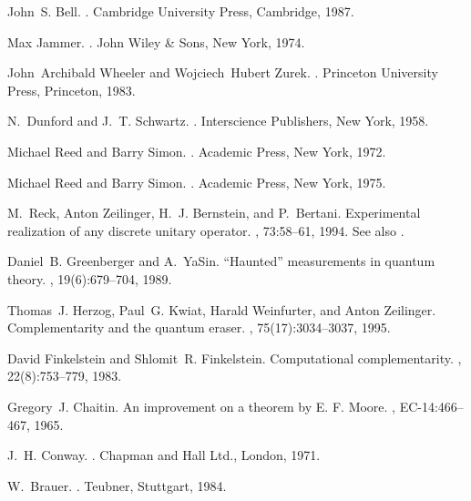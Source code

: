 \documentclass [11pt]{llncs}
\begin{document}
\begin{thebibliography}{10}
John~S. Bell.
.
\newblock Cambridge University Press, Cambridge, 1987.

Max Jammer.
.
\newblock John Wiley \& Sons, New York, 1974.

John~Archibald Wheeler and Wojciech~Hubert Zurek.
.
\newblock Princeton University Press, Princeton, 1983.

N.~Dunford and J.~T. Schwartz.
.
\newblock Interscience Publishers, New York, 1958.

Michael Reed and Barry Simon.
.
\newblock Academic Press, New York, 1972.

Michael Reed and Barry Simon.
.
\newblock Academic Press, New York, 1975.

M.~Reck, Anton Zeilinger, H.~J. Bernstein, and P.~Bertani.
\newblock Experimental realization of any discrete unitary operator.
, 73:58--61, 1994.
\newblock See also \cite{murnaghan}.

Daniel~B. Greenberger and A.~YaSin.
\newblock ``{H}aunted'' measurements in quantum theory.
, 19(6):679--704, 1989.

Thomas~J. Herzog, Paul~G. Kwiat, Harald Weinfurter, and Anton Zeilinger.
\newblock Complementarity and the quantum eraser.
, 75(17):3034--3037, 1995.

David Finkelstein and Shlomit~R. Finkelstein.
\newblock Computational complementarity.
, 22(8):753--779,
  1983.

Gregory~J. Chaitin.
\newblock An improvement on a theorem by {E}. {F}. {M}oore.
, EC-14:466--467,
  1965.

J.~H. Conway.
.
\newblock Chapman and Hall Ltd., London, 1971.

W.~Brauer.
.
\newblock Teubner, Stuttgart, 1984.


\end{thebibliography}
\end{document}
